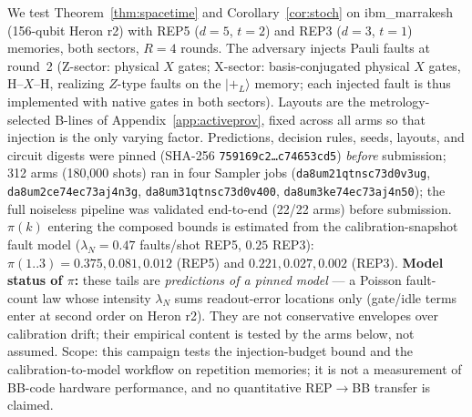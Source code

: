 \documentclass[11pt,a4paper]{article}
\begin{document}
We test Theorem~\ref{thm:spacetime} and Corollary~\ref{cor:stoch} on
ibm\_marrakesh (156-qubit Heron r2) with REP5 ($d{=}5$, $t{=}2$) and
REP3 ($d{=}3$, $t{=}1$) memories, both sectors, $R{=}4$ rounds.
The adversary injects Pauli faults at round~2 (Z-sector: physical $X$
gates; X-sector: basis-conjugated physical $X$ gates, H--$X$--H, realizing
$Z$-type faults on the $\lvert +_L \rangle$ memory; each injected fault is
thus implemented with native gates in both sectors). Layouts are the metrology-selected B-lines of
Appendix~\ref{app:activeprov}, fixed across all arms so that injection
is the only varying factor. Predictions, decision rules, seeds,
layouts, and circuit digests were pinned (SHA-256
\texttt{759169c2\dots c74653cd5}) \emph{before} submission; 312 arms
(180{,}000 shots) ran in four Sampler jobs
(\texttt{da8um21qtnsc73d0v3ug}, \texttt{da8um2ce74ec73aj4n3g},
\texttt{da8um31qtnsc73d0v400}, \texttt{da8um3ke74ec73aj4n50}); the full
noiseless pipeline was validated end-to-end (22/22 arms) before
submission. $\pi(k)$ entering the composed bounds is estimated from the
calibration-snapshot fault model ($\lambda_N{=}0.47$ faults/shot REP5,
$0.25$ REP3): $\pi(1..3)=0.375, 0.081, 0.012$ (REP5) and
$0.221, 0.027, 0.002$ (REP3). \textbf{Model status of $\pi$:} these
tails are \emph{predictions of a pinned model} --- a Poisson fault-count
law whose intensity $\lambda_N$ sums readout-error locations only
(gate/idle terms enter at second order on Heron r2). They are not
conservative envelopes over calibration drift; their empirical content
is tested by the arms below, not assumed. Scope: this campaign tests the
injection-budget bound and the calibration-to-model workflow on
repetition memories; it is not a measurement of BB-code hardware
performance, and no quantitative REP$\to$BB transfer is claimed.
\end{document}
